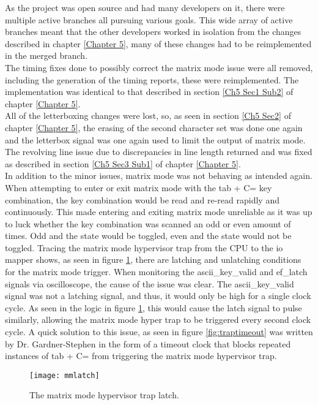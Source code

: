 As the project was open source and had many developers on it, there were multiple active branches all pursuing various goals. This wide array of active branches meant that the other developers worked in isolation from the changes described in chapter \ref{Chapter 5}, many of these changes had to be reimplemented in the merged branch.\\
The timing fixes done to possibly correct the matrix mode issue were all removed, including the generation of the timing reports, these were reimplemented. The implementation was identical to that described in section \ref{Ch5 Sec1 Sub2} of chapter \ref{Chapter 5}.\\
All of the letterboxing changes were lost, so, as seen in section \ref{Ch5 Sec2} of chapter \ref{Chapter 5}, the erasing of the second character set was done one again and the letterbox signal was one again used to limit the output of matrix mode.\\
The revolving line issue due to discrepancies in line length returned and was fixed as described in section \ref{Ch5 Sec3 Sub1} of chapter \ref{Chapter 5}.\\

In addition to the minor issues, matrix mode was not behaving as intended again. When attempting to enter or exit matrix mode with the tab + C= key combination, the key combination would be read and re-read rapidly and continuously. This made entering and exiting matrix mode unreliable as it was up to luck whether the key combination was scanned an odd or even amount of times. Odd and the state would be toggled, even and the state would not be toggled. Tracing the matrix mode hypervisor trap from the CPU to the io mapper shows, as seen in figure \ref{fig:mmlatch}, there are latching and unlatching conditions for the matrix mode trigger. When monitoring the ascii\_key\_valid and ef\_latch signals via oscilloscope, the cause of the issue was clear. The ascii\_key\_valid signal was not a latching signal, and thus, it would only be high for a single clock cycle. As seen in the logic in figure \ref{fig:mmlatch}, this would cause the latch signal to pulse similarly, allowing the matrix mode hyper trap to be triggered every second clock cycle. A quick solution to this issue, as seen in figure \ref{fig:traptimeout} was written by Dr. Gardner-Stephen in the form of a timeout clock that blocks repeated instances of tab + C= from triggering the matrix mode hypervisor trap.

\begin{figure}
  \centering
  \texttt{[image: mmlatch]}
  \caption{The matrix mode hypervisor trap latch.}
  \label{fig:mmlatch}
\end{figure}

